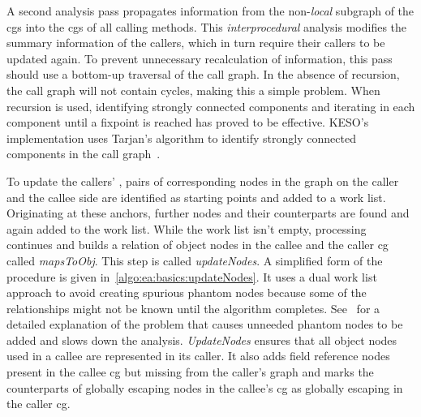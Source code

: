 			A second analysis pass propagates information from the non-\emph{local} subgraph of the \glspl{cg} into the
			\glspl{cg} of all calling methods. This \emph{interprocedural} analysis modifies the summary information of the
			callers, which in turn require their callers to be updated again. To prevent unnecessary recalculation of
			information, this pass should use a bottom-up traversal of the call graph. In the absence of recursion, the call
			graph will not contain cycles, making this a simple problem. When recursion is used, identifying strongly
			connected components and iterating in each component until a fixpoint is reached has proved to be effective.
			KESO's implementation uses Tarjan's algorithm to identify strongly connected components in the call
			graph~\cite{tarjan:72:lga}.

			To update the callers' , pairs of corresponding nodes in the graph on the caller and the callee side
			are identified as starting points and added to a work list. Originating at these anchors, further nodes and their
			counterparts are found and again added to the work list. While the work list isn't empty, processing continues and
			builds a relation of object nodes in the callee and the caller \gls{cg} called \emph{mapsToObj}. This step is
			called \emph{updateNodes}. A simplified form of the procedure is given in~\cref{algo:ea:basics:updateNodes}. It
			uses a dual work list approach to avoid creating spurious phantom nodes because some of the relationships might
			not be known until the algorithm completes. See~\cite[Sec.~3.2.1]{lang:12} for a detailed explanation of the
			problem that causes unneeded phantom nodes to be added and slows down the analysis. \emph{UpdateNodes} ensures
			that all object nodes used in a callee are represented in its caller. It also adds field reference nodes present
			in the callee \gls{cg} but missing from the caller's graph and marks the counterparts of globally escaping nodes
			in the callee's \gls{cg} as globally escaping in the caller \gls{cg}.

